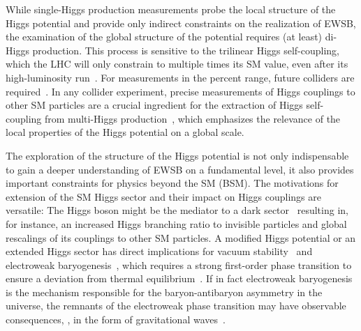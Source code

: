 While single-Higgs production measurements probe the local structure of the Higgs potential
and provide only indirect constraints on the realization of EWSB, 
the examination of the global structure of the potential requires (at least) di-Higgs production. 
%
This process is sensitive to the trilinear Higgs self-coupling, which the
LHC will only constrain to 
multiple times its SM value, even after its high-luminosity run~\cite{Kim:2018uty}. 
For measurements in the percent range, future colliders are \mbox{required~\cite{DiVita:2017vrr,Goncalves:2018yva}}. 
%
In any collider experiment, precise measurements of Higgs couplings to other SM particles are
a crucial ingredient for the extraction of Higgs self-coupling from multi-Higgs 
production~\cite{DiVita:2017vrr,Kim:2018uty,Biekotter:2018jzu},
which emphasizes the relevance 
of the local properties of the Higgs potential 
on a global scale. 


The exploration of the structure of the Higgs potential is not only indispensable
to gain a deeper understanding of EWSB on a fundamental level, 
it also provides important constraints for physics beyond the SM (BSM).
The motivations for extension of the SM Higgs sector and their impact on
Higgs couplings are versatile: 
%
The Higgs boson might be the mediator to a dark sector~\cite{Schabinger:2005ei,Barbieri:2005ri,Patt:2006fw,
Bertolami:2007wb,Gonderinger:2009jp,Andreas:2010dz,Tytgat:2010bt,Englert:2011yb,
Pospelov:2011yp,He:2011de,Fox:2011pm,Low:2011kp,Englert:2011aa,Djouadi:2011aa,
Batell:2011pz,Baek:2014jga,Butter:2015fqa,Banerjee:2016nzb,Barman:2017swy}
resulting in, for instance, an increased Higgs branching ratio to invisible particles and global 
rescalings of its couplings to other SM particles. 
%
A modified Higgs potential or an extended Higgs sector has direct implications for 
vacuum stability~\cite{Sher:1988mj,Casas:1996aq,Degrassi:2012ry,Bednyakov:2015sca} 
and 
electroweak baryogenesis~\cite{Grojean:2004xa,Delaunay:2007wb,Noble:2007kk,Huang:2015tdv,
Kobakhidze:2015xlz,Assamagan:2016azc,Chen:2017qcz,
Gan:2017mcv,Cao:2017oez,Jain:2017sqm,deVries:2017ncy,Reichert:2017puo,Carena:2018vpt}, 
which requires a strong first-order phase transition to 
ensure a deviation from thermal equilibrium~\cite{Sakharov:1967dj}.
If in fact electroweak baryogenesis is the mechanism responsible for the baryon-antibaryon asymmetry 
in the universe, the remnants of the electroweak phase transition may have 
observable consequences, \eg,  in the form of gravitational waves~\cite{Kosowsky:1992rz,Dolgov:2002ra,
Delaunay:2007wb,Chala:2019rfk}.
%
%
\\ \medskip \vspace*{-2pt}


